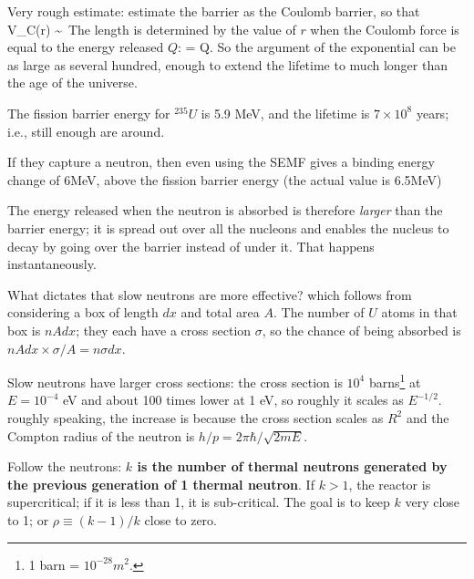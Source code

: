 \documentclass[11pt]{book}
\begin{document}
Very rough estimate: estimate the barrier as the Coulomb barrier, so that 
\be
V_C(r) \sim\,
\ee
The length is determined by the value of $r$ when the Coulomb force is equal to the energy released $Q$:
\be
  = Q.\ee
 So the argument of the exponential can be as large as several hundred,
 enough to extend the lifetime to much longer than the age of the universe.
\eee


\bei
\item The fission barrier energy for $^{235}U$ is 5.9 MeV, and the lifetime is $7\times 10^8$ years; i.e., still enough are around.
\item If they capture a neutron, then even using the SEMF gives a binding energy change of 6MeV, above the fission barrier energy (the actual value is 6.5MeV)
\item The energy released when the neutron is absorbed is therefore {\it larger} than the barrier energy; it is spread out over all the nucleons and enables the nucleus to decay by going over the barrier instead of under it. That happens instantaneously.
\item What dictates that slow neutrons are more effective? which follows from considering a box of length $dx$ and total area $A$. The number of $U$ atoms in that box is $nAdx$; they each have a cross section $\sigma$, so the chance of being absorbed is $nAdx \times \sigma/A = n\sigma dx$. 
\item Slow neutrons have larger cross sections: the cross section is $10^4$ barns\footnote{1 barn = $10^{-28}m^2$.} at $E=10^{-4}$ eV and about 100 times lower at 1 eV, so roughly it scales as $E^{-1/2}$. roughly speaking, the increase is because the cross section scales as $R^2$ and the Compton radius of the neutron is $h/p=2\pi\hbar/\sqrt{2mE}$.
\eei





Follow the neutrons: {\bf $k$ is the number of thermal neutrons generated by the previous generation of 1 thermal neutron}. If $k>1$, the reactor is supercritical; if it is less than 1, it is sub-critical. The goal is to keep $k$ very close to 1; or $\rho\equiv (k-1)/k$ close to zero.
\end{document}
